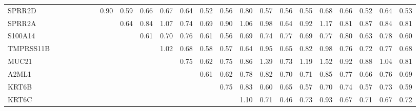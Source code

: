 \begin{longtable}{lrrrrrrrrrrrrrrrrrrrrrr}
SPRR2D    &            &            &              &             &              &              &         0.90 &          0.59 &            0.66 &        0.67 &        0.64 &        0.52 &        0.56 &        0.80 &       0.57 &        0.56 &       0.55 &        0.68 &       0.66 &          0.52 &       0.64 &           0.53 \\
SPRR2A    &            &            &              &             &              &              &              &          0.64 &            0.84 &        1.07 &        0.74 &        0.69 &        0.90 &        1.06 &       0.98 &        0.64 &       0.92 &        1.17 &       0.81 &          0.87 &       0.84 &           0.81 \\
S100A14   &            &            &              &             &              &              &              &               &            0.61 &        0.70 &        0.76 &        0.61 &        0.56 &        0.69 &       0.74 &        0.77 &       0.69 &        0.77 &       0.80 &          0.63 &       0.78 &           0.60 \\
TMPRSS11B &            &            &              &             &              &              &              &               &                 &        1.02 &        0.68 &        0.58 &        0.57 &        0.64 &       0.95 &        0.65 &       0.82 &        0.98 &       0.76 &          0.72 &       0.77 &           0.68 \\
MUC21     &            &            &              &             &              &              &              &               &                 &             &        0.75 &        0.62 &        0.75 &        0.86 &       1.39 &        0.73 &       1.19 &        1.52 &       0.92 &          0.88 &       1.04 &           0.81 \\
A2ML1     &            &            &              &             &              &              &              &               &                 &             &             &        0.61 &        0.62 &        0.78 &       0.82 &        0.70 &       0.71 &        0.85 &       0.77 &          0.66 &       0.76 &           0.69 \\
KRT6B     &            &            &              &             &              &              &              &               &                 &             &             &             &        0.75 &        0.83 &       0.60 &        0.65 &       0.57 &        0.70 &       0.74 &          0.57 &       0.73 &           0.59 \\
KRT6C     &            &            &              &             &              &              &              &               &                 &             &             &             &             &        1.10 &       0.71 &        0.46 &       0.73 &        0.93 &       0.67 &          0.71 &       0.67 &           0.72 \\

\end{longtable}

